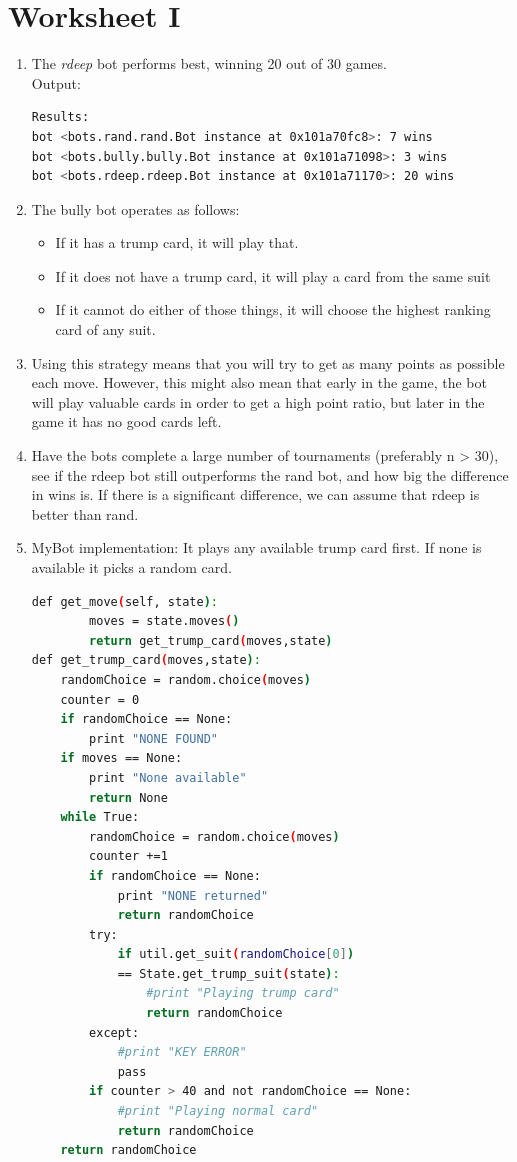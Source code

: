 \documentclass[a4paper,11pt]{article}
\begin{document}
\section{Worksheet I}
\begin{enumerate}

\item The \textit{rdeep} bot performs best, winning 20 out of 30 games. \\
Output:
\begin{lstlisting}[language=bash]
Results:
bot <bots.rand.rand.Bot instance at 0x101a70fc8>: 7 wins
bot <bots.bully.bully.Bot instance at 0x101a71098>: 3 wins
bot <bots.rdeep.rdeep.Bot instance at 0x101a71170>: 20 wins
\end{lstlisting}

\item The bully bot operates as follows:
\begin{itemize}
\item If it has a trump card, it will play that.
\item If it does not have a trump card, it will play a card from the same suit
\item If it cannot do either of those things, it will choose the highest ranking card of any suit.
\end{itemize}

\item Using this strategy means that you will try to get as many points as possible each move. However, this might also mean that early in the game, the bot will play valuable cards in order to get a high point ratio, but later in the game it has no good cards left. 

\item Have the bots complete a large number of tournaments (preferably n > 30), see if the rdeep bot still outperforms the rand bot, and how big the difference in wins is. If there is a significant difference, we can assume that rdeep is better than rand.

\item MyBot implementation:
It plays any available trump card first. If none is available it picks a random card.

\begin{lstlisting}[language=bash]
def get_move(self, state):
        moves = state.moves()
        return get_trump_card(moves,state)
def get_trump_card(moves,state):
    randomChoice = random.choice(moves)
    counter = 0
    if randomChoice == None:
        print "NONE FOUND"
    if moves == None:
        print "None available"
        return None
    while True:
        randomChoice = random.choice(moves)
        counter +=1
        if randomChoice == None:
            print "NONE returned"
            return randomChoice
        try:
            if util.get_suit(randomChoice[0]) 
            == State.get_trump_suit(state):
                #print "Playing trump card"
                return randomChoice
        except:
            #print "KEY ERROR"
            pass
        if counter > 40 and not randomChoice == None:
            #print "Playing normal card"
            return randomChoice
    return randomChoice
\end{lstlisting}


\end{enumerate}
\end{document}

